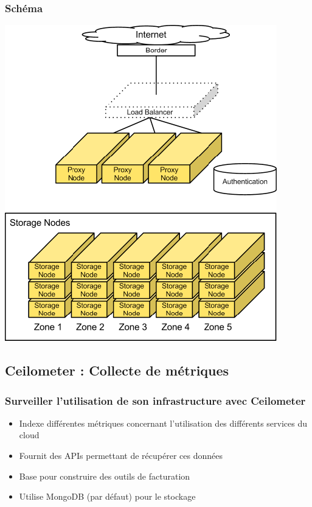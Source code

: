   \begin{frame}
    \frametitle{Schéma}
    \includegraphics[width=\textwidth,height=\textheight]{images/swift-schema.png}
  \end{frame}

  \subsection[Ceilometer]{Ceilometer : Collecte de métriques}

  \begin{frame}
    \frametitle{Surveiller l'utilisation de son infrastructure avec Ceilometer}
    \begin{itemize}
      \item Indexe différentes métriques concernant l'utilisation des différents services du cloud
      \item Fournit des APIs permettant de récupérer ces données
      \item Base pour construire des outils de facturation
      \item Utilise MongoDB (par défaut) pour le stockage
    \end{itemize}
  \end{frame}

